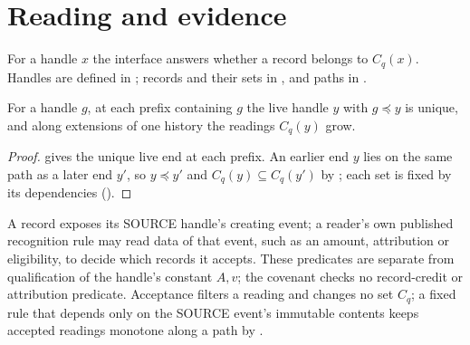 \documentclass[../main.tex]{subfiles}
\begin{document}
\section{Reading and evidence}
\label{sec:kpcfixed:interface}

\begin{definition}
\label{def:kpcfixed-interface:membership-reading}
For a handle $x$ the interface answers whether a record belongs to $C_q(x)$.
Handles are defined in ; records and
their sets in , and paths in
.
\end{definition}

\begin{corollary}
\label{cor:kpcfixed-interface:path-reading}
For a handle $g$, at each prefix containing $g$ the live handle $y$ with
$g\preceq y$ is unique, and along extensions of one history the readings
$C_q(y)$ grow.
\end{corollary}
\begin{proof}
 gives the unique live end at
each prefix. An earlier end $y$ lies on the same path as a later end $y'$,
so $y\preceq y'$ and $C_q(y)\subseteq C_q(y')$ by
; each set is fixed by its
dependencies ().
\end{proof}

\begin{remark}
\label{rem:kpcfixed-interface:record-evidence}
A record exposes its SOURCE handle's creating event; a reader's own
published recognition rule may read data of that event, such as an amount,
attribution or eligibility, to decide which records it accepts. These
predicates are separate from qualification of the handle's constant $A,v$;
the covenant checks no record-credit or attribution predicate.
Acceptance filters a reading and changes no set $C_q$; a fixed rule that
depends only on the SOURCE event's immutable contents keeps accepted
readings monotone along a path by .
\end{remark}
\end{document}
